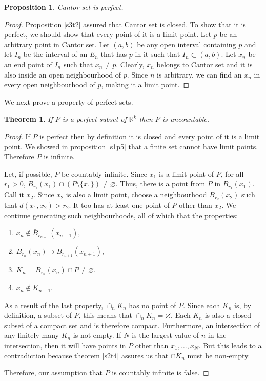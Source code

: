 \documentclass{article}
\theoremstyle{plain}
\newtheorem{thm}{Theorem}
\numberwithin{thm}{section}
\theoremstyle{plain}
\newtheorem{prop}{Proposition}
\numberwithin{prop}{section}
\theoremstyle{definition}
\numberwithin{defn}{section}
\theoremstyle{remark}
\numberwithin{equation}{section}
\begin{document}
\begin{prop}\label{s3p4}
Cantor set is perfect.
\end{prop}
\begin{proof}
Proposition \ref{s3t2} assured that Cantor set is closed. To show that it is
perfect, we should show that every point of it is a limit point. Let $p$ be an
arbitrary point in Cantor set. Let $(a, b)$ be any open interval containing 
$p$ and let $I_n$ be the interval of an $E_n$ that has $p$ in it such that 
$I_n \subset (a, b)$. Let $x_n$ be an end point of $I_n$ such that $x_n \ne p$. 
Clearly, $x_n$ belongs to Cantor set and it is also inside an open neighbourhood 
of $p$. Since $n$ is arbitrary, we can find an $x_n$ in every open neighbourhood 
of $p$, making it a limit point.
\end{proof}

We next prove a property of perfect sets.
\begin{thm}\label{s3t1}
If $P$ is a perfect subset of $\mathbb{R}^k$ then $P$ is uncountable.
\end{thm}
\begin{proof}
If $P$ is perfect then by definition it is closed and every point of it is a
limit point. We showed in proposition \ref{s1p5} that a finite set cannot have
limit points. Therefore $P$ is infinite.

Let, if possible, $P$ be countably infinite. Since $x_1$ is a limit point of 
$P$, for all $r_1 > 0$, $B_{r_1}(x_1) \cap ( P \setminus \{x_1\}) \ne 
\varnothing$. Thus, there is a point from $P$ in $B_{r_1}(x_1)$. Call it $x_2$.
Since $x_2$ is also a limit point, choose a neighbourhood $B_{r_2}(x_2)$ such
that $d(x_1, x_2) > r_2$. It too has at least one point of $P$ other than 
$x_2$. We continue generating such neighbourhoods, all of which that the 
properties:
\begin{enumerate}
\item $x_n \notin \bar{B}_{r_{n+1}}(x_{n+1})$,
\item $B_{r_n}(x_n) \supset B_{r_{n+1}}(x_{n+1})$,
\item $K_n = \bar{B}_{r_n}(x_n) \cap P \ne \varnothing$.
\item $x_n \notin K_{n+1}$.
\end{enumerate}
As a result of the last property, $\cap_n K_n$ has no point of $P$. Since each 
$K_n$ is, by definition, a subset of $P$, this means that $\cap_n K_n = 
\varnothing$. Each $K_n$ is also a closed subset of a compact set and is 
therefore compact. Furthermore, an intersection of any finitely many $K_n$ is
not empty. If $N$ is the largest value of $n$ in the intersection, then it will 
have points in $P$ other than $x_1, \ldots, x_N$. But this leads to a 
contradiction because theorem \ref{s2t4} assures us that $\cap K_n$ must be
non-empty.

Therefore, our assumption that $P$ is countably infinite is false.
\end{proof}
\end{document}
